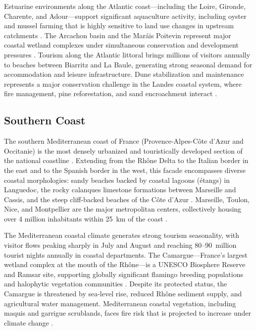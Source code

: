 \documentclass[remotesensing,article,submit,pdftex,moreauthors]{Definitions/mdpi}
\begin{document}
Estuarine environments along the Atlantic coast—including the Loire, Gironde, Charente, and Adour—support significant aquaculture activity, including oyster and mussel farming that is highly sensitive to land use changes in upstream catchments \citep{gueral2008conchyliculture}. The Arcachon basin and the Mar\'ais Poitevin represent major coastal wetland complexes under simultaneous conservation and development pressures \citep{verger2009marais}. Tourism along the Atlantic littoral brings millions of visitors annually to beaches between Biarritz and La Baule, generating strong seasonal demand for accommodation and leisure infrastructure. Dune stabilization and maintenance represents a major conservation challenge in the Landes coastal system, where fire management, pine reforestation, and sand encroachment interact \citep{maugis2011dunes}.

\subsection{Southern Coast}

The southern Mediterranean coast of France (Provence-Alpes-C\^ote d'Azur and Occitanie) is the most densely urbanized and touristically developed section of the national coastline \citep{deboudt2010littoral,viard2002tourisme}. Extending from the Rh\^one Delta to the Italian border in the east and to the Spanish border in the west, this facade encompasses diverse coastal morphologies: sandy beaches backed by coastal lagoons (étangs) in Languedoc, the rocky calanques limestone formations between Marseille and Cassis, and the steep cliff-backed beaches of the Côte d'Azur \citep{paskoff2001geomorphologie}. Marseille, Toulon, Nice, and Montpellier are the major metropolitan centers, collectively housing over 4 million inhabitants within 25~km of the coast \citep{insee2017littoral}.

The Mediterranean coastal climate generates strong tourism seasonality, with visitor flows peaking sharply in July and August and reaching 80--90~million tourist nights annually in coastal departments. The Camargue—France's largest wetland complex at the mouth of the Rhône—is a UNESCO Biosphere Reserve and Ramsar site, supporting globally significant flamingo breeding populations and halophytic vegetation communities \citep{triplet2014camargue}. Despite its protected status, the Camargue is threatened by sea-level rise, reduced Rh\^one sediment supply, and agricultural water management. Mediterranean coastal vegetation, including maquis and garrigue scrublands, faces fire risk that is projected to increase under climate change \citep{trabaud2005feux}.
\end{document}
